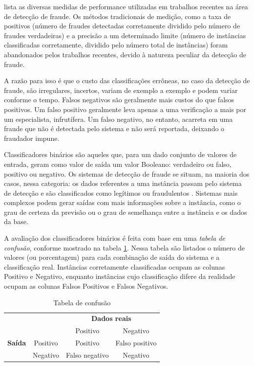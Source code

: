 \citet{Phua2010} lista as diversas medidas de performance utilizadas em trabalhos recentes na área de detecção de fraude. Os métodos tradicionais de medição, como a taxa de positivos (número de fraudes detectadas corretamente dividido pelo número de fraudes verdadeiras) e a precisão a um determinado limite (número de instâncias classificadas corretamente, dividido pelo número total de instâncias) foram abandonados pelos trabalhos recentes, devido à natureza peculiar da detecção de fraude.

A razão para isso é que o custo das classificações errôneas, no caso da detecção de fraude, são irregulares, incertos, variam de exemplo a exemplo e podem variar conforme o tempo. Falsos negativos são geralmente mais custos do que falsos positivos. Um falso positivo geralmente leva apenas a uma verificação a mais por um especialista, infrutífera. Um falso negativo, no entanto, acarreta em uma fraude que não é detectada pelo sistema e não será reportada, deixando o fraudador impune.

Classificadores binários são aqueles que, para um dado conjunto de valores de entrada, geram como valor de saída um valor Booleano: verdadeiro ou falso, positivo ou negativo. Os sistemas de detecção de fraude se situam, na maioria dos casos, nessa categoria: os dados referentes a uma instância passam pelo sistema de detecção e são classificados como legítimos ou fraudulentos \cite{Bewick2004}. Sistemas mais complexos podem gerar saídas com mais informações sobre a instância, como o grau de certeza da previsão ou o grau de semelhança entre a instância e os dados da base.

A avaliação dos classificadores binários é feita com base em uma \emph{tabela de confusão}, conforme mostrado na tabela \ref{fraud:confusion}. Nessa tabela são listados o número de valores (ou porcentagem) para cada combinação de saída do sistema e a classificação real. Instâncias corretamente classificadas ocupam as colunas Positivo e Negativo, enquanto instâncias cujo classificação difere da realidade ocupam as colunas Falsos Positivos e Falsos Negativos.

\renewcommand{\arraystretch}{1.5}
\begin{table}[h!]
    \centering
    \begin{tabular}{c l c c}
        & & \multicolumn{2}{c}{\textbf{Dados reais}} \\
        \multirow{3}{5mm}{\begin{sideways}\parbox{20mm}{\textbf{Saída}}\end{sideways}} & \multicolumn{1}{c|}{} & Positivo & Negativo \\
        \cline{2-4}
        & \multicolumn{1}{c|}{Positivo} & Positivo & Falso positivo\\
        & \multicolumn{1}{c|}{Negativo} & Falso negativo & Negativo\\
    \end{tabular}
    \caption{Tabela de confusão}
    \label{fraud:confusion}
\end{table}


